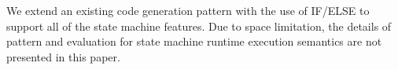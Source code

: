 We extend an existing code generation pattern with the use of IF/ELSE to support all of the state machine features. 	
Due to space limitation, the details of pattern and evaluation for state machine runtime execution semantics are not presented in this paper.




